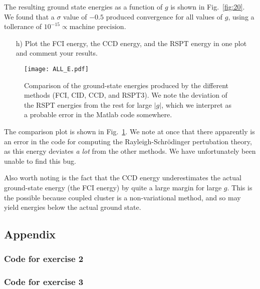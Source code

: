 \documentclass[a4paper]{article}
\newcommand{\fig}[1]{Fig.\ \ref{fig:#1}}
\begin{document}
The resulting ground state energies as a function of $g$ is shown in \fig{20}. We found that a $\sigma$ value of $-0.5$ produced convergence for all values of $g$, using a tollerance of $10^{-15}\propto\text{machine precision}$.

\begin{exframe}
\begin{itemize}
  \item[h)] Plot the FCI energy, the CCD energy, and the RSPT energy in one plot and comment your results. 
\end{itemize}
 \end{exframe} 
 \begin{figure}[p]
\centering
\texttt{[image: ALL\_E.pdf]}
\caption{Comparison of the ground-state energies produced by the different methods (FCI, CID, CCD, and RSPT3). We note the deviation of the RSPT energies from the rest for large $|g|$, which we interpret as a probable error in the {\sc Matlab} code somewhere. \label{fig:30}}
\end{figure}
The comparison plot is shown in \fig{30}. We note at once that there apparently is an error in the code for computing the Rayleigh-Schrödinger pertubation theory, as this energy deviates \emph{a lot} from the other methods. We have unfortunately been unable to find this bug.

Also worth noting is the fact that the CCD energy underestimates the actual ground-state energy (the FCI energy) by quite a large margin for large $g$. This is the possible because coupled cluster is a non-variational method, and so may yield energies below the actual ground state. 

\newpage
\subsection*{Appendix}
\subsubsection*{Code for exercise 2}

\subsubsection*{Code for exercise 3}

\end{document}
